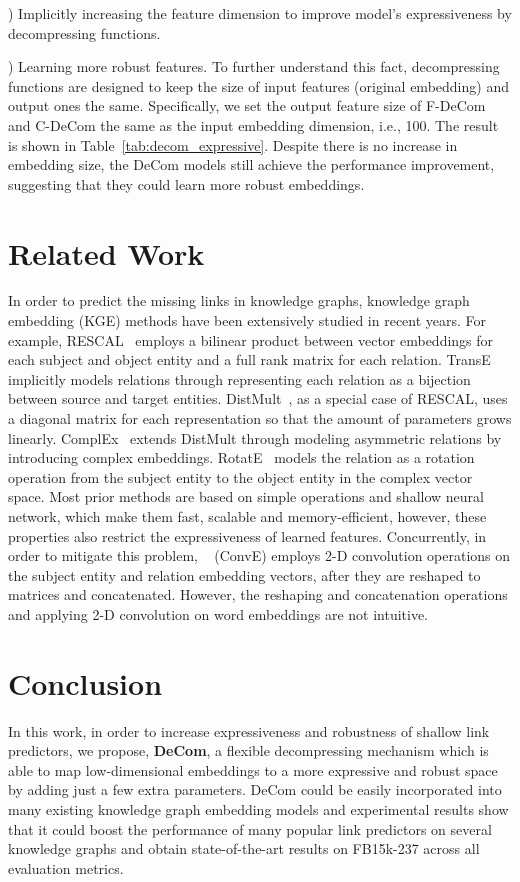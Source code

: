 \documentclass[letterpaper]{article} \usepackage{aaai20}  \usepackage{times}  \usepackage{helvet} \usepackage{courier}  \usepackage{booktabs}
\begin{document}
) Implicitly increasing the feature dimension to improve model's expressiveness by decompressing functions.  

) Learning more robust features. To further understand this fact, decompressing functions are designed to keep the size of input features (original embedding) and output ones the same. Specifically, we set the output feature size of F-DeCom and C-DeCom the same as the input embedding dimension, i.e., 100. The result is shown in Table~\ref{tab:decom_expressive}. 
Despite there is no increase in embedding size, the DeCom models still achieve the performance improvement, suggesting that they could learn more robust embeddings.



\section{Related Work}
In order to predict the missing links in knowledge graphs,  
knowledge graph embedding (KGE) methods have been extensively studied in recent years. 
For example, RESCAL~\cite{nickel2011three}  employs a bilinear product between vector embeddings for each subject and object entity and a full rank matrix for each relation.
TransE~\cite{bordes2013translating} implicitly models relations through representing each relation as a bijection between source and target entities. DistMult~\cite{yang2014embedding}, as a special case of RESCAL, uses a diagonal matrix for each representation so that the amount of parameters grows linearly.  
ComplEx~\cite{trouillon2016complex} extends DistMult through modeling asymmetric relations by introducing complex embeddings. RotatE~\cite{sun2019rotate} models the relation as a rotation operation from the subject entity to the object entity in the complex vector space.
Most prior methods are based on simple operations and shallow neural network, which make them fast, scalable and memory-efficient, however, these properties also restrict the expressiveness of learned features. Concurrently, in order to mitigate this problem, \citeauthor{dettmers2018convolutional}~ (ConvE) employs 2-D convolution operations on the subject entity and relation embedding vectors, after they are reshaped to matrices and concatenated. However, the reshaping and concatenation operations and applying 2-D convolution on word embeddings are not intuitive.


\section{Conclusion}
 In this work, in order to increase expressiveness and robustness of shallow link predictors, we propose, \textbf{DeCom}, a flexible decompressing mechanism which is able to map low-dimensional embeddings to a more expressive and robust space by adding just a few extra parameters.  DeCom could be easily incorporated into many existing knowledge graph embedding models and experimental results show that it could boost the performance of many popular link predictors on several knowledge graphs and obtain state-of-the-art results on FB15k-237 across all evaluation metrics.
\newpage


\end{document}
